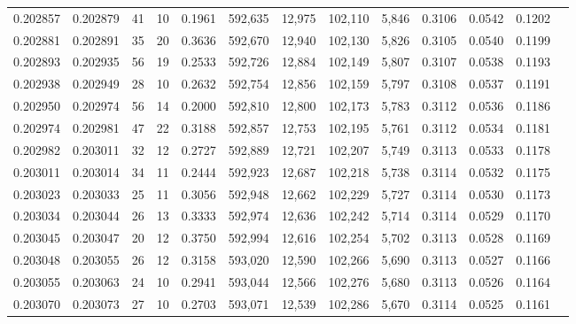\begin{tabular}{rrrrrrrrrrrrr}
0.202857 & 0.202879 &    41 &  10 &                                     0.1961 & 592,635 &  12,975 & 102,110 &   5,846 & 0.3106 & 0.0542 & 0.1202 \\
0.202881 & 0.202891 &    35 &  20 &                                     0.3636 & 592,670 &  12,940 & 102,130 &   5,826 & 0.3105 & 0.0540 & 0.1199 \\
0.202893 & 0.202935 &    56 &  19 &                                     0.2533 & 592,726 &  12,884 & 102,149 &   5,807 & 0.3107 & 0.0538 & 0.1193 \\
0.202938 & 0.202949 &    28 &  10 &                                     0.2632 & 592,754 &  12,856 & 102,159 &   5,797 & 0.3108 & 0.0537 & 0.1191 \\
0.202950 & 0.202974 &    56 &  14 &                                     0.2000 & 592,810 &  12,800 & 102,173 &   5,783 & 0.3112 & 0.0536 & 0.1186 \\
0.202974 & 0.202981 &    47 &  22 &                                     0.3188 & 592,857 &  12,753 & 102,195 &   5,761 & 0.3112 & 0.0534 & 0.1181 \\
0.202982 & 0.203011 &    32 &  12 &                                     0.2727 & 592,889 &  12,721 & 102,207 &   5,749 & 0.3113 & 0.0533 & 0.1178 \\
0.203011 & 0.203014 &    34 &  11 &                                     0.2444 & 592,923 &  12,687 & 102,218 &   5,738 & 0.3114 & 0.0532 & 0.1175 \\
0.203023 & 0.203033 &    25 &  11 &                                     0.3056 & 592,948 &  12,662 & 102,229 &   5,727 & 0.3114 & 0.0530 & 0.1173 \\
0.203034 & 0.203044 &    26 &  13 &                                     0.3333 & 592,974 &  12,636 & 102,242 &   5,714 & 0.3114 & 0.0529 & 0.1170 \\
0.203045 & 0.203047 &    20 &  12 &                                     0.3750 & 592,994 &  12,616 & 102,254 &   5,702 & 0.3113 & 0.0528 & 0.1169 \\
0.203048 & 0.203055 &    26 &  12 &                                     0.3158 & 593,020 &  12,590 & 102,266 &   5,690 & 0.3113 & 0.0527 & 0.1166 \\
0.203055 & 0.203063 &    24 &  10 &                                     0.2941 & 593,044 &  12,566 & 102,276 &   5,680 & 0.3113 & 0.0526 & 0.1164 \\
0.203070 & 0.203073 &    27 &  10 &                                     0.2703 & 593,071 &  12,539 & 102,286 &   5,670 & 0.3114 & 0.0525 & 0.1161 \\

\end{tabular}
